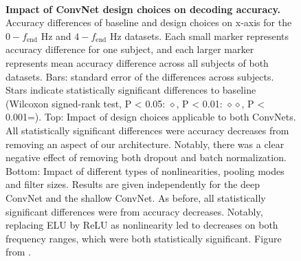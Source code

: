 \begin{figure}[h!tb]
    \captionsetup[subfigure]{labelformat=empty}
    \myfloatalign
     \\
    \vspace{-0.5cm}
    \caption[Impact of ConvNet design choices on decoding accuracy]{
    \textbf{Impact of ConvNet design choices on decoding accuracy.} 
Accuracy differences of baseline and design choices on x-axis for the $0-f_\textrm{end}$ Hz and $4-f_\textrm{end}$ Hz datasets. 
Each small marker represents accuracy difference for one subject, and each larger marker represents mean accuracy difference across all subjects of both datasets. Bars: standard error of the differences across subjects. 
Stars indicate statistically significant differences to baseline (Wilcoxon signed-rank test, P < 0.05: $\diamond$\*, P < 0.01: $\diamond\diamond$\*\*, P < 0.001=\*\*\*). Top: Impact of design choices applicable to both ConvNets. 
All statistically significant differences were accuracy decreases from removing an aspect of our architecture.
Notably, there was a clear negative effect of removing both dropout and batch normalization. Bottom: Impact of different types of nonlinearities, pooling modes and filter sizes. Results are given independently for the deep ConvNet and the shallow ConvNet.
As before, all statistically significant differences were from accuracy decreases. Notably, replacing ELU by ReLU as nonlinearity led to decreases on both frequency ranges, which were both statistically significant. 
Figure from \citet{schirrmeisterdeephbm2017}.
}
\label{design-choices-fig}
\end{figure}

